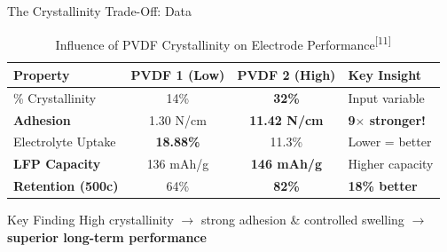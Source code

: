 \documentclass[aspectratio=169]{beamer}
\begin{document}
\begin{frame}{The Crystallinity Trade-Off: Data}
    \begin{table}
        \caption{Influence of PVDF Crystallinity on Electrode Performance\textsuperscript{[11]}}
        \centering\small
        \begin{tabular}{lccl}
            \toprule
            \textbf{Property} & \textbf{PVDF 1 (Low)} & \textbf{PVDF 2 (High)} & \textbf{Key Insight} \\
            \midrule
            \% Crystallinity & 14\% & \textbf{32\%} & Input variable \\
            \textbf{Adhesion} & 1.30 N/cm & \textbf{11.42 N/cm} & \textcolor{HighlightGreen}{\textbf{9$\times$ stronger!}} \\
            Electrolyte Uptake & \textbf{18.88\%} & 11.3\% & Lower = better \\
            \midrule
            \textbf{LFP Capacity} & 136 mAh/g & \textbf{146 mAh/g} & Higher capacity \\
            \textbf{Retention (500c)} & 64\% & \textbf{82\%} & \textcolor{HighlightGreen}{\textbf{18\% better}} \\
            \bottomrule
        \end{tabular}
    \end{table}
    
    \vspace{0.2cm}
    \begin{exampleblock}{Key Finding}
        High crystallinity $\rightarrow$ strong adhesion \& controlled swelling $\rightarrow$ \textbf{superior long-term performance}
    \end{exampleblock}
\end{frame}
\end{document}
